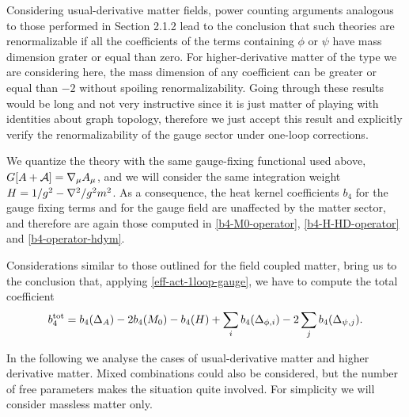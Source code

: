 Considering usual-derivative matter fields, power counting arguments analogous to those performed in Section 2.1.2 lead to the conclusion that such theories are renormalizable if all the coefficients of the terms containing $\phi$ or $\psi$ have mass dimension grater or equal than zero. For higher-derivative matter of the type we are considering here, the mass dimension of any coefficient can be greater or equal than $-2$ without spoiling renormalizability. Going through these results would be long and not very instructive since it is just matter of playing with identities about graph topology, therefore we just accept this result and explicitly verify the renormalizability of the gauge sector under one-loop corrections.


We quantize the theory with the same gauge-fixing functional used above, \ie $G[A + \mathcal{A}]= { \mathcal{\nabla} }_\mu A_\mu$, and we will consider the same integration weight \( H = 1/g^2 - { \mathcal{\nabla} }^2/g^2m^2 \). 
As a consequence, the heat kernel coefficients  $b_4$ for the gauge fixing terms and for the gauge field are unaffected by the matter sector, and therefore are again those computed in \eqref{b4-M0-operator}, \eqref{b4-H-HD-operator} and \eqref{b4-operator-hdym}.


Considerations similar to those outlined for the \ym field coupled matter, bring us to the conclusion that, applying \eqref{eff-act-1loop-gauge}, we have to compute the total coefficient
\begin{equation}\label{b4-total-most-general}
b_4^{ \text{tot} } = 
b_4(\Delta_A)
- 2 b_4(M_0)
- b_4(H)
+ \sum_i b_4(\Delta_{\phi,i})
-2 \sum_j b_4(\Delta_{\psi,j}).
\end{equation}






In the following we analyse the cases of usual-derivative matter and higher derivative matter. Mixed combinations could also be considered, but the number of free parameters makes the situation quite involved. For simplicity we will consider massless matter only.





